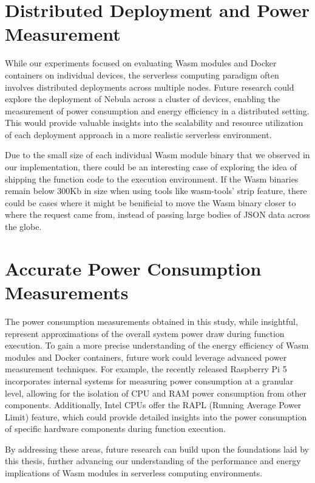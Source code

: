 \documentclass[
  table]{report}
\begin{document}
\section{Distributed Deployment and Power Measurement}

While our experiments focused on evaluating Wasm modules and Docker
containers on individual devices, the serverless computing paradigm
often involves distributed deployments across multiple nodes. Future
research could explore the deployment of Nebula across a cluster of
devices, enabling the measurement of power consumption and energy
efficiency in a distributed setting. This would provide valuable
insights into the scalability and resource utilization of each
deployment approach in a more realistic serverless environment.

Due to the small size of each individual \ac{Wasm} module binary that we
observed in our implementation, there could be an interesting case of
exploring the idea of shipping the function code to the execution
environment. If the \ac{Wasm} binaries remain below 300Kb in size when
using tools like wasm-tools' strip feature, there could be cases where
it might be benificial to move the \ac{Wasm} binary closer to where the
request came from, instead of passing large bodies of JSON data across
the globe.

\section{Accurate Power Consumption Measurements}

The power consumption measurements obtained in this study, while
insightful, represent approximations of the overall system power draw
during function execution. To gain a more precise understanding of the
energy efficiency of Wasm modules and Docker containers, future work
could leverage advanced power measurement techniques. For example, the
recently released Raspberry Pi 5 incorporates internal systems for
measuring power consumption at a granular level, allowing for the
isolation of CPU and RAM power consumption from other components.
Additionally, Intel CPUs offer the RAPL (Running Average Power Limit)
feature, which could provide detailed insights into the power
consumption of specific hardware components during function execution.

By addressing these areas, future research can build upon the
foundations laid by this thesis, further advancing our understanding of
the performance and energy implications of Wasm modules in serverless
computing environments.
\end{document}
